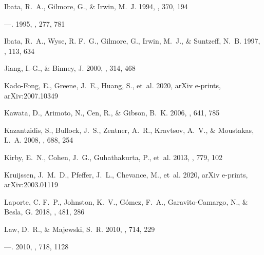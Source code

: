 \documentclass[twocolumn,tighten,twocolappendix]{aastex63}
\begin{document}
\begin{CJK*}{UTF8}{gbsn}
\begin{thebibliography}{}
{Ibata}, R.~A., {Gilmore}, G., \& {Irwin}, M.~J. 1994, \nat, 370, 194

---. 1995, \mnras, 277, 781

{Ibata}, R.~A., {Wyse}, R. F.~G., {Gilmore}, G., {Irwin}, M.~J., \& {Suntzeff},
    N.~B. 1997, \aj, 113, 634

{Jiang}, I.-G., \& {Binney}, J. 2000, \mnras, 314, 468

{Kado-Fong}, E., {Greene}, J.~E., {Huang}, S., {et~al.} 2020, arXiv e-prints,
  arXiv:2007.10349

{Kawata}, D., {Arimoto}, N., {Cen}, R., \& {Gibson}, B.~K. 2006, \apj, 641, 785

{Kazantzidis}, S., {Bullock}, J.~S., {Zentner}, A.~R., {Kravtsov}, A.~V., \&
    {Moustakas}, L.~A. 2008, \apj, 688, 254

{Kirby}, E.~N., {Cohen}, J.~G., {Guhathakurta}, P., {et~al.} 2013, \apj, 779,
    102

{Kruijssen}, J.~M.~D., {Pfeffer}, J.~L., {Chevance}, M., {et~al.} 2020, arXiv
    e-prints, arXiv:2003.01119

{Laporte}, C. F.~P., {Johnston}, K.~V., {G{\'o}mez}, F.~A., {Garavito-Camargo},
    N., \& {Besla}, G. 2018, \mnras, 481, 286

{Law}, D.~R., \& {Majewski}, S.~R. 2010{}, \apj, 714, 229

---. 2010{}, \apj, 718, 1128


\end{thebibliography}
\end{CJK*}
\end{document}
